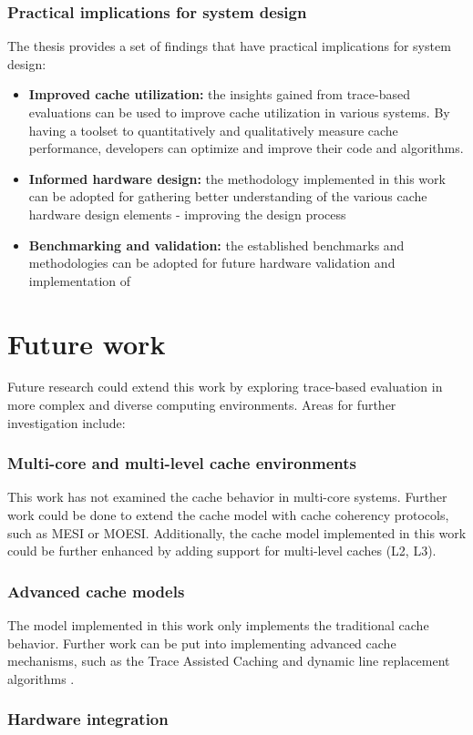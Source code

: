 \subsubsection*{Practical implications for system design}

The thesis provides a set of findings that have practical implications for system design:

\begin{itemize}
	\item \textbf{Improved cache utilization:} the insights gained from trace-based evaluations can be used to improve cache utilization in various systems. By having a toolset to
		quantitatively and qualitatively measure cache performance, developers can optimize and improve their code and algorithms.
	\item \textbf{Informed hardware design:} the methodology implemented in this work can be adopted for gathering better understanding of the various cache hardware design elements -
		improving the design process
	\item \textbf{Benchmarking and validation:} the established benchmarks and methodologies can be adopted for future hardware validation and implementation of 
\end{itemize}

\section{Future work}

Future research could extend this work by exploring trace-based evaluation in more complex and diverse computing environments. Areas for further investigation include:

\subsubsection*{Multi-core and multi-level cache environments}

This work has not examined the cache behavior in multi-core systems. Further work could be done to extend the cache model with cache coherency protocols, such as MESI or MOESI.
Additionally, the cache model implemented in this work could be further enhanced by adding support for multi-level caches (L2, L3).


\subsubsection*{Advanced cache models}

The model implemented in this work only implements the traditional cache behavior. Further work can be put into implementing advanced cache mechanisms, such as
the Trace Assisted Caching \cite{usingtrace} and dynamic line replacement algorithms \cite{dynamiceviction}.

\subsubsection*{Hardware integration}
